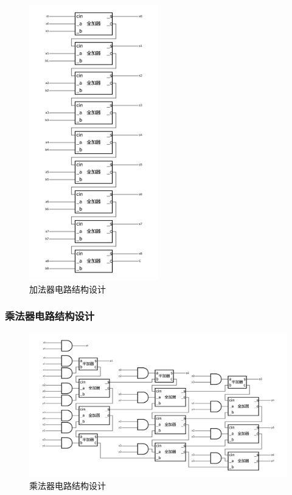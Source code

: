 \documentclass{article}
\begin{document}
\begin{figure}[H]
    \centering
    \includegraphics[width=0.5\textwidth]{8-bit加法器.pdf}
    \caption{加法器电路结构设计}
\end{figure}

\subsubsection{乘法器电路结构设计}

\begin{figure}[H]
    \centering
    \includegraphics[width=1\textwidth]{4-bit乘法器.pdf}
    \caption{乘法器电路结构设计}
\end{figure}
\end{document}

